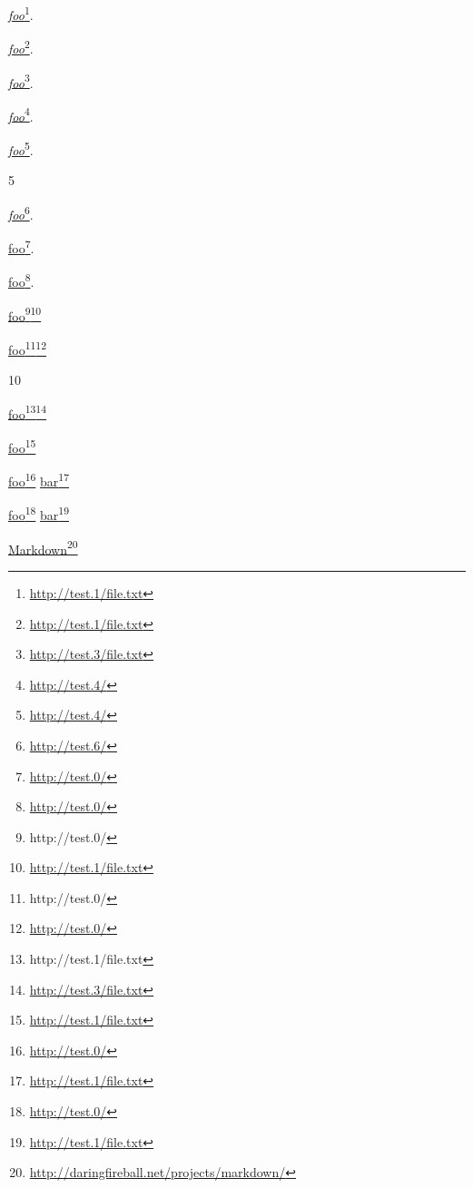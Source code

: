 
\def\mytitle{Reference Links}


\href{http://test.1/file.txt}{\emph{foo}}\footnote{\href{http://test.1/file.txt}{http://test.1/file.txt}}.

\href{http://test.1/file.txt}{\emph{foo}}\footnote{\href{http://test.1/file.txt}{http://test.1/file.txt}}.

\href{http://test.3/file.txt}{\emph{foo}}\footnote{\href{http://test.3/file.txt}{http://test.3/file.txt}}.

\href{http://test.4/}{\emph{foo}}\footnote{\href{http://test.4/}{http://test.4/}}.

\href{http://test.4/}{\emph{foo}}\footnote{\href{http://test.4/}{http://test.4/}}.

5

\href{http://test.6/}{\emph{foo}}\footnote{\href{http://test.6/}{http://test.6/}}.

\href{http://test.0/}{foo}\footnote{\href{http://test.0/}{http://test.0/}}.

\href{http://test.0/}{foo}\footnote{\href{http://test.0/}{http://test.0/}}.

\href{http://test.1/file.txt}{\href{http://test.0/}{foo}\footnote{\href{http://test.0/}{http://test.0/}}}\footnote{\href{http://test.1/file.txt}{http://test.1/file.txt}}

\href{http://test.0/}{\href{http://test.0/}{foo}\footnote{\href{http://test.0/}{http://test.0/}}}\footnote{\href{http://test.0/}{http://test.0/}}

10

\href{http://test.3/file.txt}{\href{http://test.1/file.txt}{foo}\footnote{\href{http://test.1/file.txt}{http://test.1/file.txt}}}\footnote{\href{http://test.3/file.txt}{http://test.3/file.txt}}

\href{http://test.1/file.txt}{foo}\footnote{\href{http://test.1/file.txt}{http://test.1/file.txt}}

\href{http://test.0/}{foo}\footnote{\href{http://test.0/}{http://test.0/}} \href{http://test.1/file.txt}{bar}\footnote{\href{http://test.1/file.txt}{http://test.1/file.txt}}

\href{http://test.0/}{foo}\footnote{\href{http://test.0/}{http://test.0/}}
\href{http://test.1/file.txt}{bar}\footnote{\href{http://test.1/file.txt}{http://test.1/file.txt}}

\href{http://daringfireball.net/projects/markdown/}{Markdown}\footnote{\href{http://daringfireball.net/projects/markdown/}{http://daringfireball.net/projects/markdown/}}

